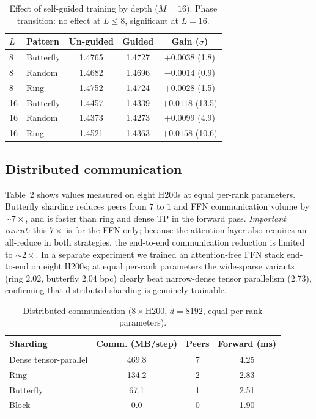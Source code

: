 \documentclass[10pt,journal]{IEEEtran}
\begin{document}
\begin{table}[!t]
\centering
\footnotesize
\caption{Effect of self-guided training by depth ($M{=}16$). Phase transition: no effect at
$L\le8$, significant at $L{=}16$.}
\label{tab:guide}
\begin{tabular}{@{}llccc@{}}
\toprule
$L$ & Pattern & Un-guided & Guided & Gain ($\sigma$) \\
\midrule
8  & Butterfly & 1.4765 & 1.4727 & $+0.0038$ (1.8) \\
8  & Random    & 1.4682 & 1.4696 & $-0.0014$ (0.9) \\
8  & Ring      & 1.4752 & 1.4724 & $+0.0028$ (1.5) \\
16 & Butterfly & 1.4457 & 1.4339 & $+0.0118$ (13.5) \\
16 & Random    & 1.4373 & 1.4273 & $+0.0099$ (4.9)  \\
16 & Ring      & 1.4521 & 1.4363 & $+0.0158$ (10.6) \\
\bottomrule
\end{tabular}
\end{table}

\subsection{Distributed communication}
Table~\ref{tab:dist} shows values measured on eight H200s at equal per-rank parameters. Butterfly
sharding reduces peers from $7$ to $1$ and FFN communication volume by $\sim\!7\times$, and is
faster than ring and dense TP in the forward pass. \emph{Important caveat:} this $7\times$ is for
the FFN only; because the attention layer also requires an all-reduce in both strategies, the
end-to-end communication reduction is limited to $\sim\!2\times$. In a separate experiment we
trained an attention-free FFN stack end-to-end on eight H200s; at equal per-rank parameters the
wide-sparse variants (ring $2.02$, butterfly $2.04$ bpc) clearly beat narrow-dense tensor
parallelism ($2.73$), confirming that distributed sharding is genuinely trainable.

\begin{table}[!t]
\centering
\footnotesize
\caption{Distributed communication ($8{\times}$H200, $d{=}8192$, equal per-rank parameters).}
\label{tab:dist}
\begin{tabular}{@{}lccc@{}}
\toprule
Sharding & Comm. (MB/step) & Peers & Forward (ms) \\
\midrule
Dense tensor-parallel & 469.8 & 7 & 4.25 \\
Ring                  & 134.2 & 2 & 2.83 \\
Butterfly             & 67.1  & 1 & 2.51 \\
Block                 & 0.0   & 0 & 1.90 \\
\bottomrule
\end{tabular}
\end{table}
\end{document}
